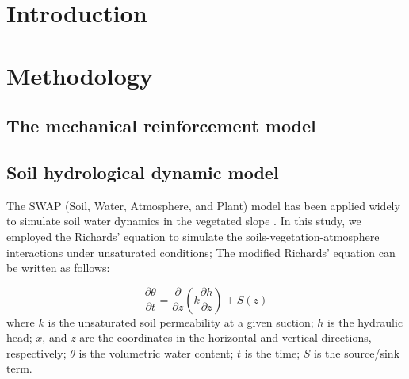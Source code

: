 

\date{Received: date / Accepted: date}


\maketitle


\begin{abstract}





\end{abstract}

\section{Introduction}


\section{Methodology}

\subsection{The mechanical reinforcement model}





\subsection{Soil hydrological dynamic model}

The SWAP (Soil, Water, Atmosphere, and Plant) model has been applied widely to simulate soil water dynamics in the vegetated slope \citep{Romano2011Par}. In this study, we employed the Richards' equation to simulate the soils-vegetation-atmosphere interactions under unsaturated conditions; The modified Richards' equation can be written as follows:

\begin{equation}\frac{\partial \theta}{\partial t}=\frac{\partial}{\partial z}(k\frac{\partial h}{\partial z}) + S(z)\end{equation}
where $k$ is the unsaturated soil permeability at a given suction; $h$ is the hydraulic head; $x$, and $z$ are the coordinates in the horizontal and vertical directions, respectively; $\theta$ is the volumetric water content; $t$ is the time; $S$ is the source/sink term.



